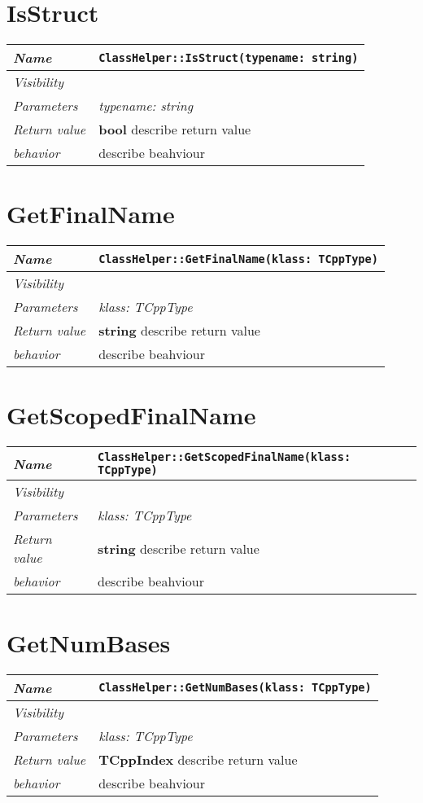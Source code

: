  \section{IsStruct}
\begin{longtable}{p{3cm} @{\hskip 1cm} p{12cm}}
 \hline
\textit{Name} & \texttt{ClassHelper::IsStruct(typename: string)}\\
\hline
 \textit{Visibility} & \\
\hline
\textit{Parameters} & \textit{typename: string}\\
\hline
\textit{Return value} & \textbf{ bool} describe return value\\
  \hline
 \textit{behavior} & describe beahviour \\
\hline
\end{longtable} \pagebreak
 \section{GetFinalName}
\begin{longtable}{p{3cm} @{\hskip 1cm} p{12cm}}
 \hline
\textit{Name} & \texttt{ClassHelper::GetFinalName(klass: TCppType)}\\
\hline
 \textit{Visibility} & \\
\hline
\textit{Parameters} & \textit{klass: TCppType}\\
\hline
\textit{Return value} & \textbf{ string} describe return value\\
  \hline
 \textit{behavior} & describe beahviour \\
\hline
\end{longtable} \pagebreak
 \section{GetScopedFinalName}
\begin{longtable}{p{3cm} @{\hskip 1cm} p{12cm}}
 \hline
\textit{Name} & \texttt{ClassHelper::GetScopedFinalName(klass: TCppType)}\\
\hline
 \textit{Visibility} & \\
\hline
\textit{Parameters} & \textit{klass: TCppType}\\
\hline
\textit{Return value} & \textbf{ string} describe return value\\
  \hline
 \textit{behavior} & describe beahviour \\
\hline
\end{longtable} \pagebreak
 \section{GetNumBases}
\begin{longtable}{p{3cm} @{\hskip 1cm} p{12cm}}
 \hline
\textit{Name} & \texttt{ClassHelper::GetNumBases(klass: TCppType)}\\
\hline
 \textit{Visibility} & \\
\hline
\textit{Parameters} & \textit{klass: TCppType}\\
\hline
\textit{Return value} & \textbf{ TCppIndex} describe return value\\
  \hline
 \textit{behavior} & describe beahviour \\
\hline
\end{longtable} \pagebreak
